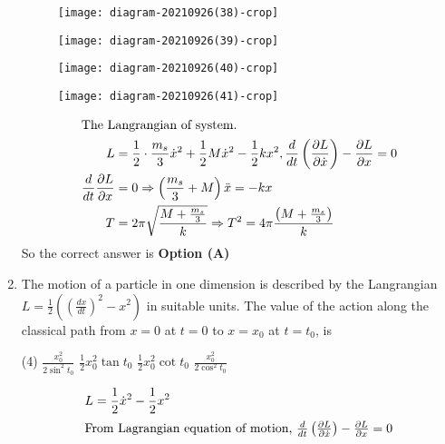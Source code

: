 \begin{enumerate}
\begin{tasks}
\begin{figure}[H]
			\centering
			\texttt{[image: diagram-20210926(38)-crop]}
		\end{figure}
		\task[\textbf{B.}] \begin{figure}[H]
			\centering
			\texttt{[image: diagram-20210926(39)-crop]}
		\end{figure}
		\task[\textbf{C.}] \begin{figure}[H]
			\centering
			\texttt{[image: diagram-20210926(40)-crop]}
		\end{figure}
		\task[\textbf{D.}] \begin{figure}[H]
			\centering
			\texttt{[image: diagram-20210926(41)-crop]}
		\end{figure}
	\end{tasks}	
\begin{answer}
	\begin{align*}
	\intertext{The Langrangian of system.}
	L&=\frac{1}{2} \cdot \frac{m_{s}}{3} \dot{x}^{2}+\frac{1}{2} M \dot{x}^{2}-\frac{1}{2} k x^{2}, \frac{d}{d t}\left(\frac{\partial L}{\partial \dot{x}}\right)-\frac{\partial L}{\partial x}=0\\
	\frac{d}{d t} \frac{\partial L}{\partial x}&=0 \Rightarrow\left(\frac{m_{s}}{3}+M\right) \ddot{x}=-k x\\
	T&=2 \pi \sqrt{\frac{M+\frac{m_{s}}{3}}{k}} \Rightarrow T^{2}=4 \pi \frac{\left(M+\frac{m_{s}}{3}\right)}{k}
	\end{align*}
	So the correct answer is \textbf{Option (A)}
\end{answer}
	\item The motion of a particle in one dimension is described by the Langrangian $L=\frac{1}{2}\left(\left(\frac{d x}{d t}\right)^{2}-x^{2}\right)$ in suitable units. The value of the action along the classical path from $x=0$ at $t=0$ to $x=x_{0}$ at $t=t_{0}$, is
	{}
	\begin{tasks}(4)
		\task[\textbf{A.}] $\frac{x_{0}^{2}}{2 \sin ^{2} t_{0}}$
		\task[\textbf{B.}] $\frac{1}{2} x_{0}^{2} \tan t_{0}$
		\task[\textbf{C.}] $\frac{1}{2} x_{0}^{2} \cot t_{0}$
		\task[\textbf{D.}] $\frac{x_{0}^{2}}{2 \cos ^{2} t_{0}}$
	\end{tasks}	
\begin{answer}
	\begin{align*}
	L&=\frac{1}{2} \dot{x}^{2}-\frac{1}{2} x^{2}\\
	\intertext{From Lagrangian equation of motion, $\frac{d}{d t}\left(\frac{\partial L}{\partial \dot{x}}\right)-\frac{\partial L}{\partial x}=0$}

\end{align*}
\end{answer}
\end{enumerate}
